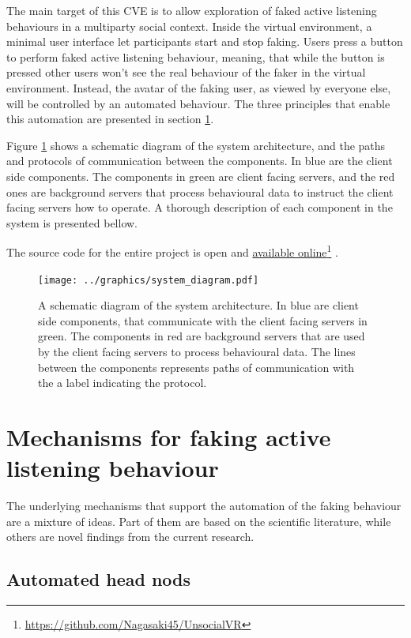 \documentclass[]{simple-thesis}
\newcommand\fnurl[2]{%
  \href{#2}{#1}\footnote{\url{#2}}%
}
\begin{document}
The main target of this CVE is to allow exploration of faked active listening behaviours in a multiparty social context.
Inside the virtual environment, a minimal user interface let participants start and stop faking.
Users press a button to perform faked active listening behaviour, meaning, that while the button is pressed other users won't see the real behaviour of the faker in the virtual environment.
Instead, the avatar of the faking user, as viewed by everyone else, will be controlled by an automated behaviour.
The three principles that enable this automation are presented in section \ref{system:mechanisms}.

Figure \ref{fig:system:diagram} shows a schematic diagram of the system architecture, and the paths and protocols of communication between the components.
In blue are the client side components.
The components in green are client facing servers, and the red ones are background servers that process behavioural data to instruct the client facing servers how to operate.
A thorough description of each component in the system is presented bellow.

The source code for the entire project is open and \fnurl{available online}{https://github.com/Nagasaki45/UnsocialVR}.

\begin{figure}
  \texttt{[image: ../graphics/system\_diagram.pdf]}
  \caption{A schematic diagram of the system architecture. In blue are client side components, that communicate with the client facing servers in green. The components in red are background servers that are used by the client facing servers to process behavioural data. The lines between the components represents paths of communication with the a label indicating the protocol.}
  \label{fig:system:diagram}
\end{figure}

\section{Mechanisms for faking active listening behaviour}\label{system:mechanisms}

The underlying mechanisms that support the automation of the faking behaviour are a mixture of ideas.
Part of them are based on the scientific literature, while others are novel findings from the current research.

\subsection{Automated head nods}
\end{document}
